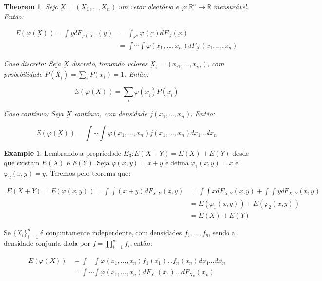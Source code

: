 \documentclass[
]{article}
\newtheorem{theorem}{Theorem}[section]
\theoremstyle{definition}
\theoremstyle{definition}
\newtheorem{example}{Example}[section]
\theoremstyle{definition}
\theoremstyle{definition}
\theoremstyle{remark}
\begin{document}
\begin{theorem}
Seja \(\underbar{X} = (X_{1},\ldots,X_{n})\) um vetor aleatório e \(\varphi:\mathbb{R}^{n} \to \mathbb{R}\) mensurável. Então:

\begin{align*}
E(\varphi(\underbar{X})) = \int ydF_{\varphi\left(\underbar{X}\right)}(y) &= \int_{\mathbb{R}^{n}}\varphi(\underbar{x})dF_{\underbar{X}}(\underbar{x}) \\
&= \int \cdots \int \varphi(x_{1},\ldots,x_{n})dF_{\underbar{X}}(x_{1},\ldots,x_{n})
\end{align*}

Caso discreto: Seja \(\underbar{X}\) discreto, tomando valores \(\underbar{X}_{i} = (x_{i1},\ldots,x_{in})\), com probabilidade \(P(\underbar{X}_{i}) = \sum_{i}P(x_{i}) = 1\). Então:

\begin{equation*}
E(\varphi(\underbar{X})) = \sum_{i}\varphi(\underbar{x}_{i})P(\underbar{x}_{i})
\end{equation*}

Caso contínuo: Seja \(\underbar{X}\) contínuo, com densidade \(f(x_{1},\ldots,x_{n})\). Então:

\begin{equation*}
E(\varphi(\underbar{X})) = \int \cdots \int \varphi(x_{1},\ldots,x_{n}) f(x_{1},\ldots,x_{n})dx_{1}\ldots dx_{n}
\end{equation*}
\end{theorem}

\begin{example}
Lembrando a propriedade \(E_{3}: E(X + Y) = E(X) + E(Y)\) desde que existam \(E(X)\) e \(E(Y)\). Seja \(\varphi(x,y) = x + y\) e defina \(\varphi_{1}(x,y) = x\) e \(\varphi_{2}(x,y) = y\). Teremos pelo teorema que:

\begin{align*}
E(X + Y) = E(\varphi(x,y)) = \int \int(x+y)dF_{X,Y}(x,y) &= \int\int x dF_{X,Y}(x,y) + \int\int y dF_{X,Y}(x,y) \\
&= E(\varphi_{1}(x,y)) + E(\varphi_{2}(x,y)) \\
&= E(X) + E(Y)
\end{align*}
\end{example}

Se \(\{X_{i}\}_{i=1}^{n}\) é conjuntamente independente, com densidades \(f_{1},\ldots,f_{n}\), sendo a densidade conjunta dada por \(f = \prod_{i = 1}^{n}f_{i}\), então:

\begin{align*}
E(\varphi(\underbar{X})) &= \int \cdots \int \varphi(x_{1},\ldots,x_{n})f_{1}(x_{1})\ldots f_{n}(x_{n})dx_{1}\ldots dx_{n} \\
&= \int \cdots \int \varphi(x_{1}, \ldots, x_{n})dF_{X_{1}}(x_{1})\ldots dF_{X_{n}}(x_{n})
\end{align*}
\end{document}
